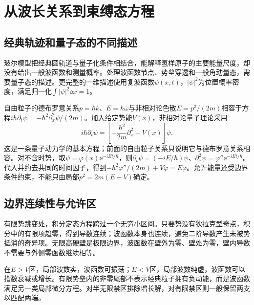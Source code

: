 \section{从波长关系到束缚态方程}
\subsection{经典轨迹和量子态的不同描述}
玻尔模型把经典圆轨道与量子化条件相结合，能解释氢样原子的主要能量尺度，却没有给出一般波函数和测量概率。处理波函数节点、势垒穿透和一般角动量态，需要量子态的描述。更完整的一维描述使用复波函数$\psi(x,t)$，$|\psi|^2$为位置概率密度，满足归一化$\int|\psi|^2\dd x=1$。

自由粒子的德布罗意关系$p=\hbar k$、$E=\hbar\omega$与非相对论色散$E=p^2/(2m)$相容于方程$i\hbar\partial_t\psi=-\hbar^2\partial_x^2\psi/(2m)$。加入给定势能$V(x)$，非相对论量子理论采用
\[
 i\hbar\partial_t\psi=\left[-\frac{\hbar^2}{2m}\partial_x^2+V(x)\right]\psi.
\]
这是一条量子动力学的基本方程；前面的自由粒子关系只说明它与德布罗意关系相容。对不含时势，取$\psi=\varphi(x)\ee^{-iEt/\hbar}$，则$\partial_t\psi=(-iE/\hbar)\psi$、$\partial_x^2\psi=\varphi''\ee^{-iEt/\hbar}$。代入并约去共同的时间因子，得到$-\hbar^2\varphi''/(2m)+V\varphi=E\varphi$。允许能量还受边界条件约束，不能只由局部$p^2=2m(E-V)$确定。

\subsection{边界连续性与允许区}
有限势跳变处，积分定态方程跨过一个无穷小区间。只要势没有狄拉克型奇点，积分中的有限项趋零，得到导数连续；波函数本身也连续，避免二阶导数产生未被势抵消的奇异项。无限高硬壁是极限边界，波函数在壁外为零、壁处为零，壁内导数不需要与外侧零函数继续相等。

在$E>V$区，局部波数实，波函数可振荡；$E<V$区，局部波数纯虚，波函数可以指数衰减或增长。有限势垒内的非零尾部不表示经典粒子拥有负动能，而是波函数满足另一类局部微分方程。对半无限禁区排除增长解，对有限禁区则一般保留两支以匹配两端。

